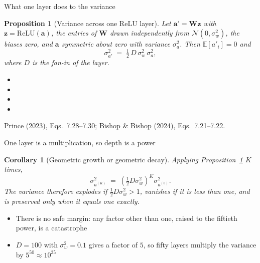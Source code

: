 \documentclass[aspectratio=169, 11pt]{beamer}
\newtheorem{propx}[theorem]{Proposition}
\newtheorem{corx}[theorem]{Corollary}
\newcommand{\srcline}[1]{%
  \par\vspace{0.25em}%
  {\scriptsize\color{mcMuted}\hfill #1\par}}
\begin{document}
\begin{frame}{What one layer does to the variance}
  \vspace{-0.25em}
  \begin{propx}[Variance across one ReLU layer]\label{th:var}
    \small
    Let $\mathbf{a}' = \mathbf{W} \mathbf{z}$ with $\mathbf{z} = \mathrm{ReLU}(\mathbf{a})$, the entries of $\mathbf{W}$ drawn
    independently from $\mathcal{N}(0, \sigma_w^2)$, the biases zero,
    and $\mathbf{a}$ symmetric about zero with variance $\sigma_a^2$. Then
    $\mathbb{E}[a'_i] = 0$ and
    \[
      \sigma_{a'}^2 \;=\; \tfrac12\, D\, \sigma_w^2\, \sigma_a^2 ,
    \]
    where $D$ is the fan-in of the layer.
  \end{propx}
  \vspace{0.05em}
  {\footnotesize
  \begin{itemize}\itemsep0.26em
    \item {}
    \item {}
    \item {}
    \item {}
  \end{itemize}}
  \vspace{-0.4em}
  \srcline{Prince (2023), Eqs.~7.28--7.30; Bishop \& Bishop (2024),
  Eqs.~7.21--7.22.}
\end{frame}

\begin{frame}{One layer is a multiplication, so depth is a power}
  \vspace{-0.25em}
  \begin{corx}[Geometric growth or geometric decay]\label{th:geom}
    \small
    Applying Proposition~\ref{th:var} $K$ times,
    \[
      \sigma^2_{a^{(K)}} \;=\;
        \left(\tfrac12 D \sigma_w^2\right)^{K} \sigma^2_{a^{(0)}} .
    \]
    The variance therefore explodes if
    $\tfrac12 D \sigma_w^2 > 1$, vanishes if it is less than one, and is
    preserved only when it equals one exactly.
  \end{corx}
  \vspace{0.25em}
  \begin{itemize}\itemsep0.3em
    \item There is no safe margin: any factor other than one, raised to
          the fiftieth power, is a catastrophe
    \item $D = 100$ with $\sigma_w^2 = 0.1$ gives a factor of $5$, so
          fifty layers multiply the variance by $5^{50} \approx 10^{35}$
  \end{itemize}
\end{frame}
\end{document}
